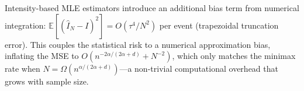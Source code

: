 \begin{remark}
Intensity-based MLE estimators introduce an additional bias term from numerical
integration: $\mathbb{E}[(\hat{I}_N - I)^2] = O(\tau^4/N^2)$ per event
(trapezoidal truncation error). This couples the statistical risk to a
numerical approximation bias, inflating the MSE to
$O(n^{-2\alpha/(2\alpha+d)} + N^{-2})$, which only matches the minimax rate
when $N = \Omega(n^{\alpha/(2\alpha+d)})$—a non-trivial computational overhead
that grows with sample size.
\end{remark}
